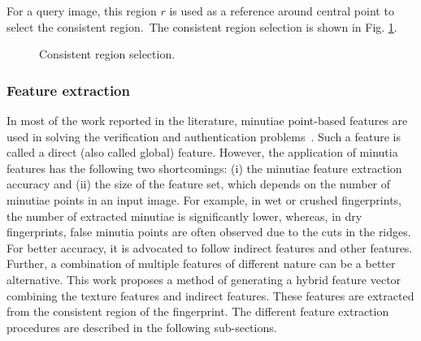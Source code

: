 For a query image, this region $r$ is used as a reference around central
point to select the consistent region.~The consistent region selection is shown
in Fig. \ref{fig:consistent}.
\begin{figure}[!ht]
	\centering
	  
	\caption{Consistent region selection.}
	\label{fig:consistent}
	\vspace{-6mm}
\end{figure}

\par


\subsubsection{Feature extraction}
In most of the work reported in the literature, minutiae point-based features are
used in solving the verification and authentication problems~\cite{liu2017feature}. Such a feature is called a direct (also called
global) feature. However, the application of minutia features has the following
two shortcomings: (i) the minutiae feature extraction accuracy and (ii) the size
of the feature set, which depends on the number of minutiae points in an input
image. For example, in wet or crushed fingerprints, the number of extracted
minutiae is significantly lower, whereas, in dry fingerprints, false minutia
points are often observed due to the cuts in the ridges. For better
accuracy, it is advocated to follow indirect features and other features. Further, a combination
of multiple features of different nature can be a better alternative. This work
proposes a method of generating a hybrid feature vector combining the texture
features and indirect features. These features are extracted from the consistent
region of the fingerprint. The different feature extraction procedures are
described in the following sub-sections.

